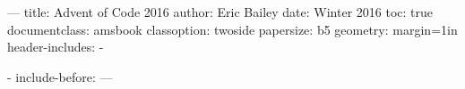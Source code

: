 ---
title: Advent of Code 2016
author: Eric Bailey
date: Winter 2016
toc: true
documentclass: amsbook
classoption: twoside
papersize: b5
geometry: margin=1in
header-includes:
- \usepackage{minted}
- \renewcommand{\chaptername}{Day}
include-before: \frontmatter
---

\mainmatter
